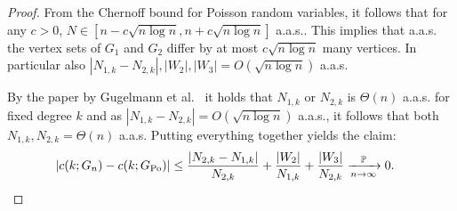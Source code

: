 \begin{proof}
From the Chernoff bound for Poisson random variables, it follows that for any $c>0$, $N \in [n-c\sqrt{n\log n},n+c\sqrt{n\log n}]$ a.a.s.. This implies that a.a.s. the vertex sets of $G_1$ and $G_2$ differ by at most $c\sqrt{n\log n}$ many vertices. In particular also $|N_{1,k}-N_{2,k}|,|W_2|,|W_3|=O(\sqrt{n \log n})$ a.a.s. 

By the paper by Gugelmann et al.~\cite{gugelmann2012random} it holds that $N_{1,k}$ or $N_{2,k}$ is $\Theta(n)$ a.a.s. for fixed degree $k$ and as $|N_{1,k}-N_{2,k}| =O(\sqrt{n\log n})$ a.a.s., it follows that both $N_{1,k},N_{2,k} = \Theta(n)$ a.a.s. Putting everything together yields the claim:
\begin{align*}
|c(k;G_n)-c(k;G_{{\mathrm{Po}}})| &\leq \frac{|N_{2,k}-N_{1,k}|}{N_{2,k}}+\frac{|W_2|}{N_{1,k}}+\frac{|W_3|}{N_{2,k}} \xrightarrow[n\rightarrow\infty]{\mathbb{P}} 0.
\end{align*}


\end{proof}


